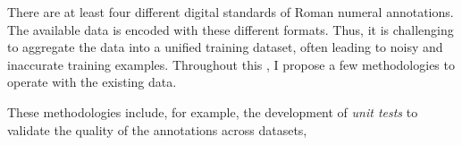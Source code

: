 

There are at least four different digital standards of Roman
numeral annotations. The available data is encoded with
these different formats. Thus, it is challenging to
aggregate the data into a unified training dataset, often
leading to noisy and inaccurate training examples.
Throughout this \thesisdiss, I propose a few methodologies
to operate with the existing data.

These methodologies include, for example, the development of
\emph{unit tests} to validate the quality of the annotations
across datasets,

